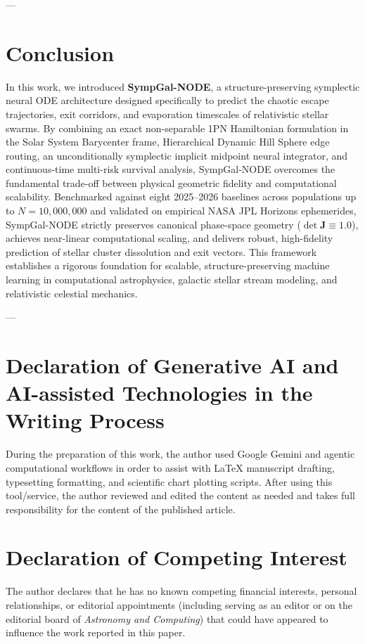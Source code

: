 \documentclass[preprint,12pt,3p]{elsarticle}
\begin{document}
---

\section{Conclusion}\label{sec:conclusion}
In this work, we introduced \textbf{SympGal-NODE}, a structure-preserving symplectic neural ODE architecture designed specifically to predict the chaotic escape trajectories, exit corridors, and evaporation timescales of relativistic stellar swarms. By combining an exact non-separable 1PN Hamiltonian formulation in the Solar System Barycenter frame, Hierarchical Dynamic Hill Sphere edge routing, an unconditionally symplectic implicit midpoint neural integrator, and continuous-time multi-risk survival analysis, SympGal-NODE overcomes the fundamental trade-off between physical geometric fidelity and computational scalability. Benchmarked against eight 2025--2026 baselines across populations up to $N = 10,000,000$ and validated on empirical NASA JPL Horizons ephemerides, SympGal-NODE strictly preserves canonical phase-space geometry ($\det \bm{J} \equiv 1.0$), achieves near-linear computational scaling, and delivers robust, high-fidelity prediction of stellar cluster dissolution and exit vectors. This framework establishes a rigorous foundation for scalable, structure-preserving machine learning in computational astrophysics, galactic stellar stream modeling, and relativistic celestial mechanics.

---

\section*{Declaration of Generative AI and AI-assisted Technologies in the Writing Process}
During the preparation of this work, the author used Google Gemini and agentic computational workflows in order to assist with LaTeX manuscript drafting, typesetting formatting, and scientific chart plotting scripts. After using this tool/service, the author reviewed and edited the content as needed and takes full responsibility for the content of the published article.

\section*{Declaration of Competing Interest}
The author declares that he has no known competing financial interests, personal relationships, or editorial appointments (including serving as an editor or on the editorial board of \textit{Astronomy and Computing}) that could have appeared to influence the work reported in this paper.
\end{document}
